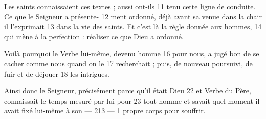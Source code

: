 Les saints connaissaient ces textes ; aussi ont-ils	 
11	 	tenu cette ligne de conduite. Ce que le Seigneur a présente-	 
12	 	ment ordonné, déjà avant sa venue dans la chair il l'exprimait	 
13	 	dans la vie des saints. Et c'est là la règle donnée aux hommes,	 
14	 	qui mène à la perfection : réaliser ce que Dieu a ordonné.

Voilà pourquoi le Verbe lui-même, devenu homme	 
16	 	pour nous, a jugé bon de se cacher comme nous quand on le	 
17	 	recherchait ; puis, de nouveau poursuivi, de fuir et de déjouer	 
18	 	les intrigues.

Ainsi donc le Seigneur, précisément parce qu'il était Dieu	 
22	 	et Verbe du Père, connaissait le temps mesuré par lui pour	 
23	 	tout homme et savait quel moment il avait fixé lui-même à son	 
 	--- 213 ---	 
1	 	propre corps pour souffrir.